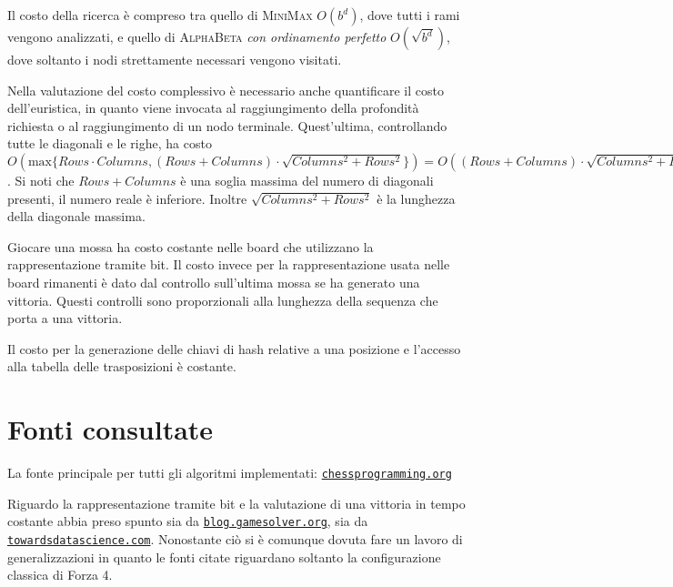 \documentclass[a4paper]{article}
\begin{document}
Il costo della ricerca è compreso tra quello di \textsc{MiniMax} $O(b^d)$, 
dove tutti i rami vengono analizzati, e quello di \textsc{AlphaBeta} 
\emph{con ordinamento perfetto} $O(\sqrt{b^d})$, dove soltanto i nodi 
strettamente necessari vengono visitati.\medskip

Nella valutazione del costo complessivo è necessario anche quantificare 
il costo dell'euristica, in quanto viene invocata al raggiungimento della 
profondità richiesta o al raggiungimento di un nodo terminale. Quest'ultima, 
controllando tutte le diagonali e le righe, ha costo $O(\textrm{max}\{Rows \cdot 
Columns, (Rows + Columns) \cdot \sqrt{Columns^2 + Rows^2}\}) = O((Rows + Columns) 
\cdot \sqrt{Columns^2 + Rows^2})$. Si noti che $Rows + Columns$ è una soglia 
massima del numero di diagonali presenti, il numero reale è inferiore. Inoltre 
$\sqrt{Columns^2 + Rows^2}$ è la lunghezza della diagonale massima.\medskip

Giocare una mossa ha costo costante nelle board che utilizzano la rappresentazione 
tramite bit. Il costo invece per la rappresentazione usata nelle board rimanenti
è dato dal controllo sull'ultima mossa se ha generato una vittoria. Questi 
controlli sono proporzionali alla lunghezza della sequenza che porta a una 
vittoria.\medskip

Il costo per la generazione delle chiavi di hash relative a una posizione e 
l'accesso alla tabella delle trasposizioni è costante.

\section{Fonti consultate}
La fonte principale per tutti gli algoritmi implementati: 
\href{chessprogramming.org}{\texttt{chessprogramming.org}}\medskip

Riguardo la rappresentazione tramite bit e la valutazione di una vittoria in 
tempo costante abbia preso spunto sia da \href{http://blog.gamesolver.org/solving-connect-four/06-bitboard/}{\texttt{blog.gamesolver.org}},
sia da \href{https://towardsdatascience.com/creating-the-perfect-connect-four-ai-bot-c165115557b0}{\texttt{towardsdatascience.com}}.
Nonostante ciò si è comunque dovuta fare un lavoro di generalizzazioni in quanto 
le fonti citate riguardano soltanto la configurazione classica di Forza 4.
\end{document}
